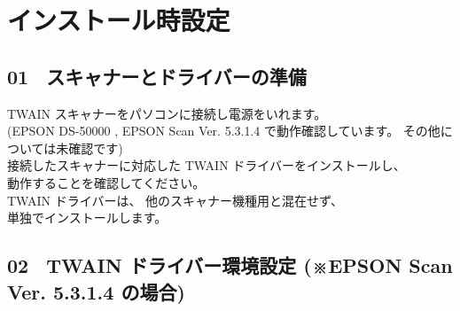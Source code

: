 \documentclass[a4paper,10pt]{article}
\renewcommand{\baselinestretch}{1.24}
\begin{document}
\fancyfoot[R]{\vskip 0.1em \textbf{\thepage}}

\newpage

\renewcommand{\baselinestretch}{1.40}

\normalsize

\section*{インストール時設定}

\subsection*{01 \ スキャナーとドライバーの準備}

\noindent TWAIN スキャナーをパソコンに接続し電源をいれます。\\
(EPSON DS-50000 , EPSON Scan Ver. 5.3.1.4 で動作確認しています。 その他については未確認です)\\
接続したスキャナーに対応した TWAIN ドライバーをインストールし、\\
動作することを確認してください。\\
TWAIN ドライバーは、 他のスキャナー機種用と混在せず、\\
単独でインストールします。\\

\subsection*{02 \ TWAIN ドライバー環境設定 (※EPSON Scan Ver. 5.3.1.4 の場合)}
\end{document}

